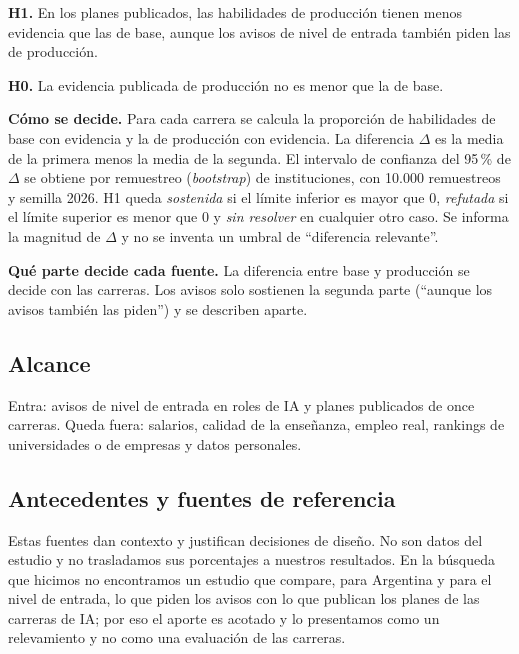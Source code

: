 \documentclass[11pt,a4paper]{article}
\begin{document}
\textbf{H1.} En los planes publicados, las habilidades de producción tienen menos evidencia que las de base, aunque los avisos de nivel de entrada también piden las de producción.

\textbf{H0.} La evidencia publicada de producción no es menor que la de base.

\textbf{Cómo se decide.} Para cada carrera se calcula la proporción de habilidades de base con evidencia y la de producción con evidencia. La diferencia $\Delta$ es la media de la primera menos la media de la segunda. El intervalo de confianza del 95\,\% de $\Delta$ se obtiene por remuestreo (\emph{bootstrap}) de instituciones, con 10.000 remuestreos y semilla 2026. H1 queda \emph{sostenida} si el límite inferior es mayor que 0, \emph{refutada} si el límite superior es menor que 0 y \emph{sin resolver} en cualquier otro caso. Se informa la magnitud de $\Delta$ y no se inventa un umbral de ``diferencia relevante''.

\textbf{Qué parte decide cada fuente.} La diferencia entre base y producción se decide con las carreras. Los avisos solo sostienen la segunda parte (``aunque los avisos también las piden'') y se describen aparte.

\subsection{Alcance}
Entra: avisos de nivel de entrada en roles de IA y planes publicados de once carreras. Queda fuera: salarios, calidad de la enseñanza, empleo real, rankings de universidades o de empresas y datos personales.

\subsection{Antecedentes y fuentes de referencia}\label{sec:antecedentes}
Estas fuentes dan contexto y justifican decisiones de diseño. No son datos del estudio y no trasladamos sus porcentajes a nuestros resultados. En la búsqueda que hicimos no encontramos un estudio que compare, para Argentina y para el nivel de entrada, lo que piden los avisos con lo que publican los planes de las carreras de IA; por eso el aporte es acotado y lo presentamos como un relevamiento y no como una evaluación de las carreras.
\end{document}
